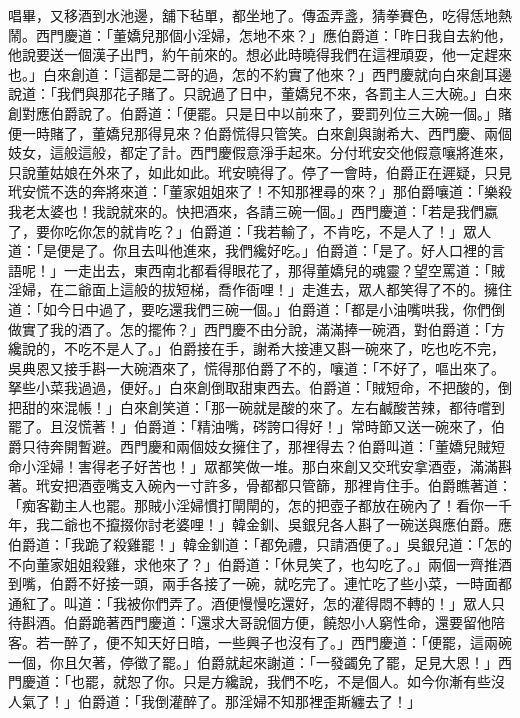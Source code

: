 唱畢，又移酒到水池邊，舖下毡單，都坐地了。傳盃弄盞，猜拳賽色，吃得恁地熱鬧。西門慶道：「董嬌兒那個小淫婦，怎地不來？」應伯爵道：「昨日我自去約他，他說要送一個漢子出門，約午前來的。想必此時曉得我們在這裡頑耍，他一定趕來也。」白來創道：「這都是二哥的過，怎的不約實了他來？」西門慶就向白來創耳邊說道：「我們與那花子賭了。只說過了日中，董嬌兒不來，各罰主人三大碗。」白來創對應伯爵說了。伯爵道：「便罷。只是日中以前來了，要罰列位三大碗一個。」賭便一時賭了，董嬌兒那得見來？伯爵慌得只管笑。白來創與謝希大、西門慶、兩個妓女，這般這般，都定了計。西門慶假意淨手起來。分付玳安交他假意嚷將進來，只說董姑娘在外來了，如此如此。玳安曉得了。停了一會時，伯爵正在遲疑，只見玳安慌不迭的奔將來道：「董家姐姐來了！不知那裡尋的來？」那伯爵嚷道：「樂殺我老太婆也！我說就來的。快把酒來，各請三碗一個。」西門慶道：「若是我們嬴了，要你吃你怎的就肯吃？」伯爵道：「我若輸了，不肯吃，不是人了！」眾人道：「是便是了。你且去叫他進來，我們纔好吃。」伯爵道：「是了。好人口裡的言語呢！」一走出去，東西南北都看得眼花了，那得董嬌兒的魂靈？望空罵道：「賊淫婦，在二爺面上這般的拔短梯，喬作衙哩！」走進去，眾人都笑得了不的。擁住道：「如今日中過了，要吃還我們三碗一個。」伯爵道：「都是小油嘴哄我，你們倒做實了我的酒了。怎的擺佈？」西門慶不由分說，滿滿捧一碗酒，對伯爵道：「方纔說的，不吃不是人了。」伯爵接在手，謝希大接連又斟一碗來了，吃也吃不完，吳典恩又接手斟一大碗酒來了，慌得那伯爵了不的，嚷道：「不好了，嘔出來了。拏些小菜我過過，便好。」白來創倒取甜東西去。伯爵道：「賊短命，不把酸的，倒把甜的來混帳！」白來創笑道：「那一碗就是酸的來了。左右鹹酸苦辣，都待嚐到罷了。且沒慌著！」伯爵道：「精油嘴，硶誇口得好！」常時節又送一碗來了，伯爵只待奔開暫避。西門慶和兩個妓女擁住了，那裡得去？伯爵叫道：「董嬌兒賊短命小淫婦！害得老子好苦也！」眾都笑做一堆。那白來創又交玳安拿酒壺，滿滿斟著。玳安把酒壺嘴支入碗內一寸許多，骨都都只管篩，那裡肯住手。伯爵瞧著道：「痴客勸主人也罷。那賊小淫婦慣打閛閛的，怎的把壺子都放在碗內了！看你一千年，我二爺也不攛掇你討老婆哩！」韓金釧、吳銀兒各人斟了一碗送與應伯爵。應伯爵道：「我跪了殺雞罷！」韓金釧道：「都免禮，只請酒便了。」吳銀兒道：「怎的不向董家姐姐殺雞，求他來了？」伯爵道：「休見笑了，也勾吃了。」兩個一齊推酒到嘴，伯爵不好接一頭，兩手各接了一碗，就吃完了。連忙吃了些小菜，一時面都通紅了。叫道：「我被你們弄了。酒便慢慢吃還好，怎的灌得悶不轉的！」眾人只待斟酒。伯爵跪著西門慶道：「還求大哥說個方便，饒恕小人窮性命，還要留他陪客。若一醉了，便不知天好日暗，一些興子也沒有了。」西門慶道：「便罷，這兩碗一個，你且欠著，停徵了罷。」伯爵就起來謝道：「一發蠲免了罷，足見大恩！」西門慶道：「也罷，就恕了你。只是方纔說，我們不吃，不是個人。如今你漸有些沒人氣了！」伯爵道：「我倒灌醉了。那淫婦不知那裡歪斯纏去了！」

